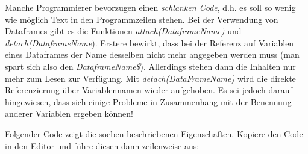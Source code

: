 \documentclass[]{article}
\begin{document}
Manche Programmierer bevorzugen einen \emph{schlanken Code}, d.h. es
soll so wenig wie möglich Text in den Programmzeilen stehen. Bei der
Verwendung von Dataframes gibt es die Funktionen
\emph{attach(DataframeName)} und \emph{detach(DataframeName}). Erstere
bewirkt, dass bei der Referenz auf Variablen eines Dataframes der Name
desselben nicht mehr angegeben werden muss (man spart sich also den
\emph{DataframeName\$}). Allerdings stehen dann die Inhalten nur mehr
zum Lesen zur Verfügung. Mit \emph{detach(DataFrameName)} wird die
direkte Referenzierung über Variablennamen wieder aufgehoben. Es sei
jedoch darauf hingewiesen, dass sich einige Probleme in Zusammenhang mit
der Benennung anderer Variablen ergeben können!

Folgender Code zeigt die soeben beschriebenen Eigenschaften. Kopiere den
Code in den Editor und führe diesen dann zeilenweise aus:
\end{document}
